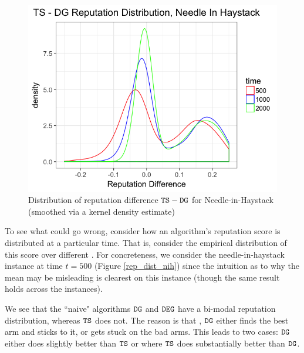 \documentclass[../competing_bandits.tex]{subfiles}
\begin{document}
\begin{figure}[ht]
\includegraphics[scale=0.35]{figures/ts_dg_rep_diff_nih}
\caption{Distribution of reputation difference $\mathtt{TS}-\mathtt{DG}$ for  Needle-in-Haystack 
(smoothed via a kernel density estimate)}
\label{ts_dg_rep_diff_nih}
\end{figure}

To see what could go wrong, consider how an algorithm's reputation score is distributed at a particular time. That is, consider the empirical distribution of this score over different \MRVs. For concreteness, we consider the needle-in-haystack instance at time $t=500$ (Figure \ref{rep_dist_nih}) since the intuition as to why the mean may be misleading is clearest on this instance (though the same result holds across the instances).

We see that the ``naive" algorithms $\mathtt{DG}$ and $\mathtt{DEG}$ have a bi-modal reputation distribution, whereas $\mathtt{TS}$ does not. The reason is that , $\mathtt{DG}$ either finds the best arm and sticks to it, or gets stuck on the bad arms. This leads to two cases: $\mathtt{DG}$ either does slightly better than $\mathtt{TS}$ or where $\mathtt{TS}$ does substantially better than $\mathtt{DG}$.
\end{document}
